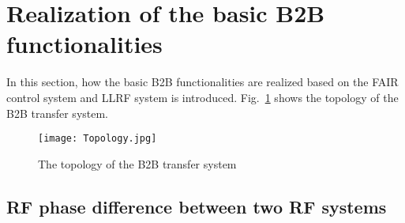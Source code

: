 \section{Realization of the basic B2B functionalities}
In this section, how the basic B2B functionalities are realized based on the FAIR control system and LLRF system is introduced.
Fig.~\ref{Topology} shows the topology of the B2B transfer system.
\begin{figure}[!htb]
   \centering   
   \texttt{[image: Topology.jpg]}
   \caption{The topology of the B2B transfer system}
   \label{Topology}
\end{figure}
\subsection{RF phase difference between two RF systems}
